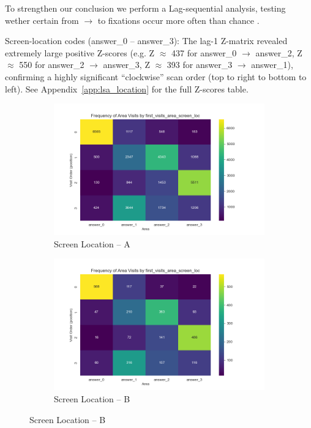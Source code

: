 \documentclass[manuscript,review,anonymous]{acmart}
\begin{document}
    To strengthen our conclusion we perform a Lag-sequential analysis, testing wether certain from $\to$ to fixations occur more often than chance \citet{bakeman1995log}.

    Screen-location codes (answer\_0 -- answer\_3): The lag-1 Z-matrix revealed extremely large positive Z-scores (e.g. Z  $\approx$ 437 for answer\_0 $\to$ answer\_2, Z $\approx$ 550 for answer\_2 $\to$ answer\_3, Z  $\approx$ 393 for answer\_3 $\to$ answer\_1), confirming a highly significant “clockwise” scan order (top to right to bottom to left). See Appendix~\ref{app:lsa_location} for the full Z-scores table.


        \begin{figure}[htbp]
          \centering
        
          \begin{subfigure}{0.48\linewidth}
            \includegraphics[width=\linewidth]{plots/visits/matrix__first_visits_area_screen_loc_hunters_A.png}
            \caption{Screen Location – A}
            \label{fig:hunt_a}
          \end{subfigure}\hfill
          \begin{subfigure}{0.48\linewidth}
            \includegraphics[width=\linewidth]{plots/visits/matrix__first_visits_area_screen_loc_hunters_B.png}
            \caption{Screen Location – B}
            \label{fig:hunt_b}
          \end{subfigure}
        

\end{figure}
\end{document}
